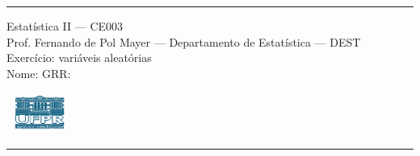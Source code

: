 \documentclass[a4paper,11pt,fleqn]{article}\usepackage[]{graphicx}\usepackage[]{color}
\theoremstyle{definition}
\begin{document}
\reversemarginpar %





\hrule
\vspace{0.3cm}

\begin{minipage}[c]{.85\textwidth}
  Estatística II --- CE003 \\
  Prof. Fernando de Pol Mayer --- Departamento de Estatística --- DEST \\
  Exercício: variáveis aleatórias \\
  Nome:   \hfill GRR: \hspace{2cm}
\end{minipage}\hfill
\begin{minipage}[c]{.15\textwidth}
\flushright
\includegraphics[width=2.2cm]{../img/ufpr-logo.png}
\end{minipage}

\vspace{0.3cm}
\hrule
\vspace{0.3cm}

\end{document}
